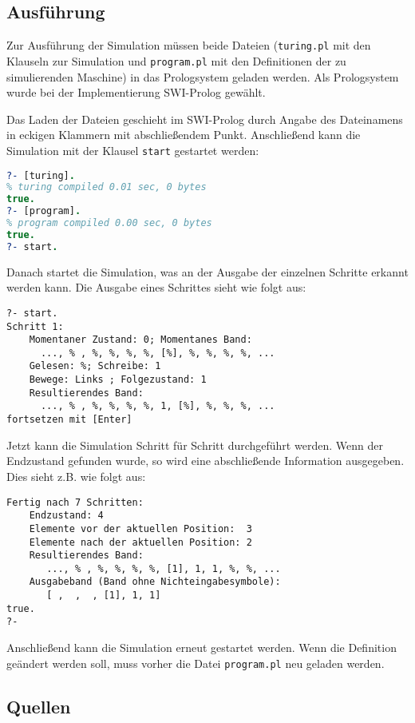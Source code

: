 \documentclass[final,a4paper,11pt,notitlepage,halfparskip]{scrreprt}
\begin{document}
\section{Ausführung}
Zur Ausführung der Simulation müssen beide Dateien (\texttt{turing.pl}
mit den Klauseln zur Simulation und \texttt{program.pl} mit den
Definitionen der zu simulierenden Maschine) in das Prologsystem geladen
werden. Als Prologsystem wurde bei der Implementierung SWI-Prolog
gewählt.  

Das Laden der Dateien geschieht im SWI-Prolog durch Angabe des
Dateinamens in eckigen Klammern mit abschließendem Punkt. Anschließend
kann die Simulation mit der Klausel \texttt{start} gestartet werden:
\begin{lstlisting}[language=Prolog]
?- [turing].
% turing compiled 0.01 sec, 0 bytes
true.
?- [program].
% program compiled 0.00 sec, 0 bytes
true.
?- start.
\end{lstlisting}
Danach startet die Simulation, was an der Ausgabe der einzelnen Schritte
erkannt werden kann. Die Ausgabe eines Schrittes sieht wie folgt aus:
\begin{lstlisting}[]
?- start.
Schritt 1:
    Momentaner Zustand: 0; Momentanes Band:
      ..., % , %, %, %, %, [%], %, %, %, %, ...
    Gelesen: %; Schreibe: 1
    Bewege: Links ; Folgezustand: 1
    Resultierendes Band: 
      ..., % , %, %, %, %, 1, [%], %, %, %, ...
fortsetzen mit [Enter]
\end{lstlisting}
Jetzt kann die Simulation Schritt für Schritt durchgeführt werden. Wenn
der Endzustand gefunden wurde, so wird eine abschließende Information
ausgegeben. Dies sieht z.B. wie folgt aus:
\begin{lstlisting}[]
Fertig nach 7 Schritten:
    Endzustand: 4
    Elemente vor der aktuellen Position:  3
    Elemente nach der aktuellen Position: 2
    Resultierendes Band:
       ..., % , %, %, %, %, [1], 1, 1, %, %, ...
    Ausgabeband (Band ohne Nichteingabesymbole):
       [ ,  ,  , [1], 1, 1]
true.
?- 
\end{lstlisting}
Anschließend kann die Simulation erneut gestartet werden. Wenn die
Definition geändert werden soll, muss vorher die Datei
\texttt{program.pl} neu geladen werden.

\pagebreak
\begin{appendix}
    \chapter{Quellen}
    
    \pagebreak
    
\end{appendix}
\end{document}

